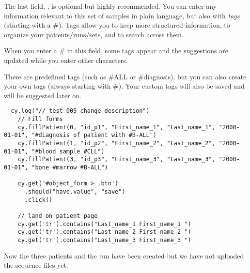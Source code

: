 The last field, ,
is optional but highly recommended.
You can enter any information relevant to this set of samples
in plain language, but also with \emph{tags} (starting with a \#).
Tags allow you to keep more structured information,
to organize your patients/runs/sets, and to search across them.

When you enter a \# in this field, some tags appear and the
suggestions are  updated while you enter other characters.

There are predefined tags (such as \#ALL or \#diagnosis),
but you can also create your own tags (always starting with \#).
Your custom tags will also be saved and will be suggested later on.

\begin{verbatim}
  cy.log("// test_005_change_description")
    // Fill forms
    cy.fillPatient(0, "id_p1", "First_name_1", "Last_name_1", "2000-01-01", "#diagnosis of patient with #B-ALL")
    cy.fillPatient(1, "id_p2", "First_name_2", "Last_name_2", "2000-01-01", "#blood sample #CLL")
    cy.fillPatient(3, "id_p3", "First_name_3", "Last_name_3", "2000-01-01", "bone #marrow #B-ALL")

    cy.get('#object_form > .btn')
      .should("have.value", "save")
      .click()

    // land on patient page
    cy.get('tr').contains("Last_name_1 First_name_1 ")
    cy.get('tr').contains("Last_name_2 First_name_2 ")
    cy.get('tr').contains("Last_name_3 First_name_3 ")

\end{verbatim}





Now the three patients and the run have been created but we have not uploaded
the sequence files yet.

